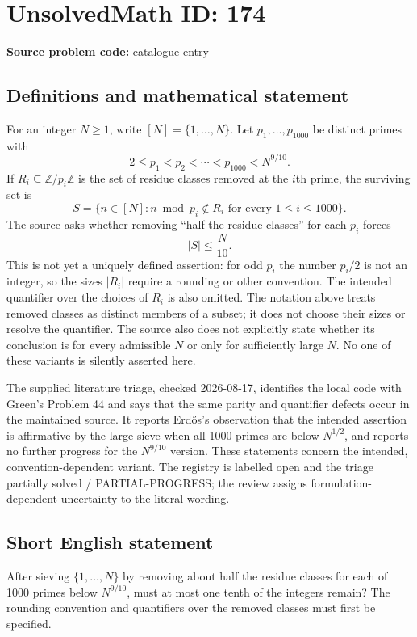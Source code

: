 \documentclass[11pt]{article}
\newcommand{\Z}{\mathbb{Z}}
\begin{document}
\section*{UnsolvedMath ID: 174}
\textbf{Source problem code:} catalogue entry
\subsection{Definitions and mathematical statement}
For an integer $N\geq1$, write $[N]=\{1,\ldots,N\}$. Let $p_1,\ldots,p_{1000}$ be distinct primes with
\[2\leq p_1<p_2<\cdots<p_{1000}<N^{9/10}.\]
If $R_i\subseteq\Z/p_i\Z$ is the set of residue classes removed at the $i$th prime, the surviving set is
\[S=\{n\in[N]: n\bmod p_i\notin R_i\text{ for every }1\leq i\leq1000\}.\]
The source asks whether removing ``half the residue classes'' for each $p_i$ forces
\[|S|\leq\frac{N}{10}.\]
This is not yet a uniquely defined assertion: for odd $p_i$ the number $p_i/2$ is not an integer, so the sizes $|R_i|$ require a rounding or other convention. The intended quantifier over the choices of $R_i$ is also omitted. The notation above treats removed classes as distinct members of a subset; it does not choose their sizes or resolve the quantifier. The source also does not explicitly state whether its conclusion is for every admissible $N$ or only for sufficiently large $N$. No one of these variants is silently asserted here.

The supplied literature triage, checked 2026-08-17, identifies the local code with Green's Problem 44 and says that the same parity and quantifier defects occur in the maintained source. It reports Erd\H{o}s's observation that the intended assertion is affirmative by the large sieve when all 1000 primes are below $N^{1/2}$, and reports no further progress for the $N^{9/10}$ version. These statements concern the intended, convention-dependent variant. The registry is labelled open and the triage partially solved / PARTIAL-PROGRESS; the review assigns formulation-dependent uncertainty to the literal wording.
\subsection{Short English statement}
After sieving $\{1,\ldots,N\}$ by removing about half the residue classes for each of 1000 primes below $N^{9/10}$, must at most one tenth of the integers remain? The rounding convention and quantifiers over the removed classes must first be specified.
\end{document}
